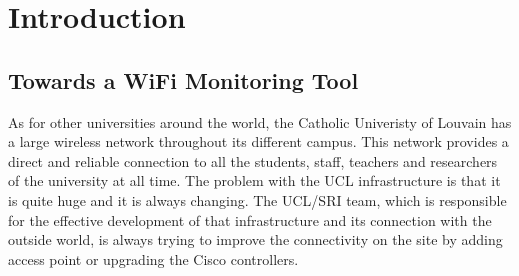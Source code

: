 
\chapter{Introduction} %

\label{Chapter1} %




\section{Towards a WiFi Monitoring Tool}
As for other universities around the world, the Catholic Univeristy of Louvain has a large wireless network throughout its different campus. This network provides a direct and reliable connection to all the students, staff, teachers and researchers of the university at all time. The problem with the UCL infrastructure is that it is quite huge and it is always changing. The UCL/SRI team, which is responsible for the effective development of that infrastructure and its connection with the outside world, is always trying to improve the connectivity on the site by adding access point or upgrading the Cisco controllers.\\


